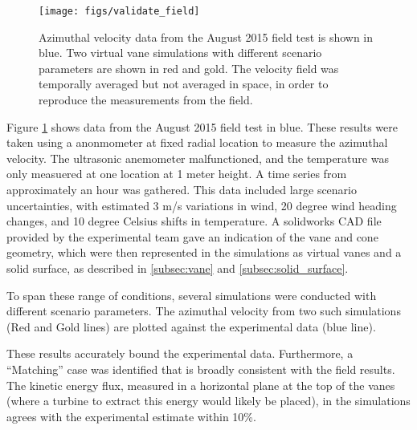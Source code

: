  \begin{figure}[!htb]
  \begin{center}
   \texttt{[image: figs/validate\_field]}
   \caption{Azimuthal velocity data from the August 2015 field test is
   shown in blue. Two virtual vane simulations with different scenario
   parameters are shown in red and gold. The velocity field was
   temporally averaged but not averaged in space, in order to reproduce
   the measurements from the field.}
   \label{fig:field_val}
  \end{center}
 \end{figure}
%
%

Figure \ref{fig:field_val} shows data from the August 2015 field test in
blue. These results were taken using a anonmometer at fixed radial
location to measure the azimuthal velocity. The ultrasonic anemometer
malfunctioned, and the temperature was only measuered at one location at
1 meter height. A time series from approximately an hour was gathered. 
This data included large scenario uncertainties, with estimated 3
m/s variations in wind, 20 degree wind heading changes, and 10 degree
Celsius shifts in temperature. A solidworks CAD file provided by the
experimental team gave an indication of the vane and cone geometry,
which were then represented in the simulations as virtual vanes and a
solid surface, as described in \ref{subsec:vane} and
\ref{subsec:solid_surface}.  

To span these range of conditions, several simulations were conducted
with different scenario parameters. The azimuthal velocity from two such
simulations (Red and Gold lines) are plotted against the experimental
data (blue line).  

These results accurately bound the experimental data. Furthermore, a
``Matching'' case was identified that is broadly consistent with the
field results. The kinetic energy flux, measured in a horizontal plane
at the top of the vanes (where a turbine to extract this energy would
likely be placed), in the simulations agrees with the experimental
estimate within 10\%. 


%
% 
%
% 
%
%
%
%
